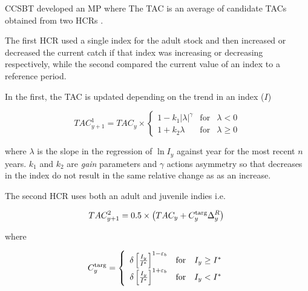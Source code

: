 CCSBT developed an MP where The TAC is an average of candidate TACs obtained from two HCRs \citep{hillary2013sbthcr}.

The first HCR used a single index for the adult stock and then increased or decreased the current catch if that index was increasing or decreasing respectively, while the second compared the current value of an index to a reference period.

In the first, the TAC is updated depending on the trend in an index ($I$)

\begin{equation}
 TAC^1_{y+1}=TAC_y\times \left\{\begin{array}{rcl}  {1-k_1|\lambda|^{\gamma}} & \mbox{for} & \lambda<0\\[0.35cm]
{1+k_2\lambda} & \mbox{for} & \lambda\geq 0 
    \end{array}\right.
\end{equation}
        

where $\lambda$ is the slope in the regression of $\ln I_y$ against year for the most recent $n$ years. $k_1$ and $k_2$ are \textit{gain} parameters and $\gamma$ actions asymmetry so that decreases in the index do not result in the same relative change as as an increase.


The second HCR uses both an adult and juvenile indies i.e.

\begin{equation} 
     TAC^2_{y+1} = 0.5\times\left(TAC_y+C^{\rm targ}_y\Delta^R_y\right)\\
\end{equation}

where 

\begin{equation} 
  C^{\rm targ}_y = 
  \left\{\begin{array}{rcl} {\delta \left[\frac{I_{y}}{I^*}\right]^{1-\varepsilon_b}} & \mbox{for} & I_{y}\geq I^*\\
                            {\delta \left[\frac{I_{y}}{I^*}\right]^{1+\varepsilon_b}} & \mbox{for} & I_{y}<I^* \\
    \end{array}\right.
\end{equation}

